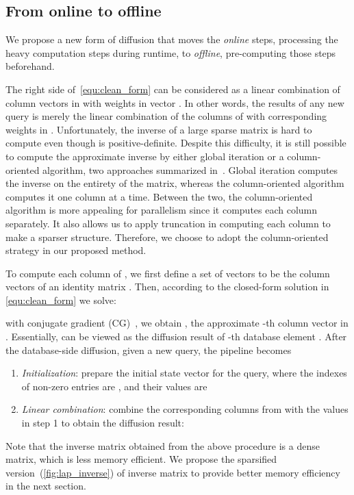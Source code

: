 \documentclass[letterpaper]{article} \usepackage{aaai19}  \usepackage{times}  \usepackage{helvet}  \usepackage{courier}  \usepackage{url}  \usepackage{graphicx}  \frenchspacing  \setlength{\pdfpagewidth}{8.5in}  \setlength{\pdfpageheight}{11in}
\begin{document}
\subsection{From online to offline}
We propose a new form of diffusion that moves the \textit{online} steps, processing the heavy computation steps during runtime, to \textit{offline}, pre-computing those steps beforehand.

The right side of~\cref{equ:clean_form} can be considered as a linear combination of column vectors in  with weights in vector .
In other words, the results of any new query is merely the linear combination of the columns of  with corresponding weights in .
Unfortunately, the inverse of a large sparse matrix is hard to compute even though  is positive-definite.
Despite this difficulty, it is still possible to compute the approximate inverse by either global iteration or a column-oriented algorithm, two approaches summarized in~\cite{saad2003iterative}.
Global iteration computes the inverse on the entirety of the matrix, whereas the column-oriented algorithm computes it one column at a time.
Between the two, the column-oriented algorithm is more appealing for parallelism since it computes each column separately.
It also allows us to apply truncation in computing each column to make a sparser structure.
Therefore, we choose to adopt the column-oriented strategy in our proposed method.

To compute each column of , we first define a set of vectors  to be the column vectors of an identity matrix .
Then, according to the closed-form solution in \cref{equ:clean_form} we solve:

 with conjugate gradient (CG)~\cite{nocedal2006numerical}, we obtain , the approximate -th column vector in .
Essentially,  can be viewed as the diffusion result of -th database element .
After the database-side diffusion, given a new query, the pipeline becomes
\begin{enumerate}
\item \textit{Initialization}: prepare the initial state vector  for the query, where the indexes of non-zero entries are , and their values are 
\item \textit{Linear combination}: combine the corresponding columns  from  with the values in step 1 to obtain the diffusion result: 
\end{enumerate}

Note that the inverse matrix  obtained from the above procedure is a dense matrix, which is less memory efficient.
We propose the sparsified version~(\cref{fig:lap_inverse}) of inverse matrix  to provide better memory efficiency in the next section.
\end{document}
